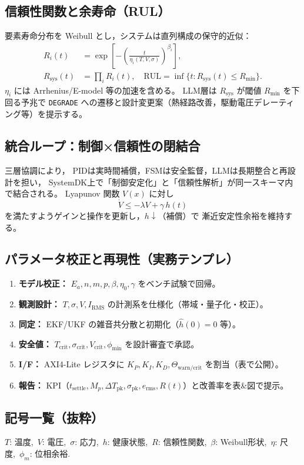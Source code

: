 \subsection{信頼性関数と余寿命（RUL）}
要素寿命分布を Weibull とし，システムは直列構成の保守的近似：
\begin{align}
R_i(t) &= \exp\!\left[-\left(\frac{t}{\eta_i(T,V,\sigma)}\right)^{\beta_i}\right],\\
R_{\mathrm{sys}}(t) &= \prod_i R_i(t),\quad
\mathrm{RUL} = \inf\{t: R_{\mathrm{sys}}(t)\le R_{\min}\}.
\end{align}
$\eta_i$ には Arrhenius/E-model 等の加速を含める。
LLM層は $R_{\mathrm{sys}}$ が閾値 $R_{\min}$ を下回る予兆で
\texttt{DEGRADE} への遷移と設計変更案（熱経路改善，駆動電圧デレーティング等）を提示する。

\subsection{統合ループ：制御×信頼性の閉結合}
三層協調により，
PIDは実時間補償，FSMは安全監督，LLMは長期整合と再設計を担い，
SystemDK上で「制御安定化」と「信頼性解析」が同一スキーマ内で結合される。
Lyapunov 関数 $V(x)$ に対し
\[
\dot{V} \le -\lambda V + \gamma\,h(t)
\]
を満たすようゲインと操作を更新し，$h\!\downarrow$（補償）で
漸近安定性余裕を維持する。

\subsection*{パラメータ校正と再現性（実務テンプレ）}
\begin{enumerate}
\item \textbf{モデル校正：} $E_a,n,m,p,\beta,\eta_0,\gamma$ をベンチ試験で回帰。
\item \textbf{観測設計：} $T,\sigma,V,I_{\mathrm{RMS}}$ の計測系を仕様化（帯域・量子化・校正）。
\item \textbf{同定：} EKF/UKF の雑音共分散と初期化（$\hat{h}(0)=0$ 等）。
\item \textbf{安全値：} $T_{\mathrm{crit}},\sigma_{\mathrm{crit}},V_{\mathrm{crit}},\phi_{\min}$ を設計審査で承認。
\item \textbf{I/F：} AXI4-Lite レジスタに $K_P,K_I,K_D,\Theta_{\mathrm{warn/crit}}$ を割当（表で公開）。
\item \textbf{報告：} KPI（$t_{\mathrm{settle}},M_p,\Delta T_{\mathrm{pk}},\sigma_{\mathrm{pk}},e_{\mathrm{rms}},R(t)$）と改善率を表\&図で提示。
\end{enumerate}

\subsection*{記号一覧（抜粋）}
$T$: 温度,\ $V$: 電圧,\ $\sigma$: 応力,\ $h$: 健康状態,\ $R$: 信頼性関数,\
$\beta$: Weibull形状,\ $\eta$: 尺度,\ $\phi_m$: 位相余裕.

